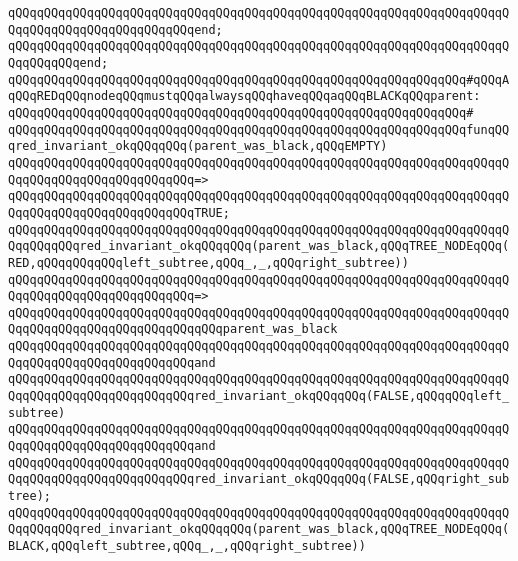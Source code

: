 \verb|qQQqqQQqqQQqqQQqqQQqqQQqqQQqqQQqqQQqqQQqqQQqqQQqqQQqqQQqqQQqqQQqqQQqqQQqqQQqqQQqqQQqqQQqqQQqqQQqend;|\newline
\verb|qQQqqQQqqQQqqQQqqQQqqQQqqQQqqQQqqQQqqQQqqQQqqQQqqQQqqQQqqQQqqQQqqQQqqQQqqQQqqQQqend;|\newline
\newline
\verb|qQQqqQQqqQQqqQQqqQQqqQQqqQQqqQQqqQQqqQQqqQQqqQQqqQQqqQQqqQQqqQQq#qQQqAqQQqREDqQQqnodeqQQqmustqQQqalwaysqQQqhaveqQQqaqQQqBLACKqQQqparent:|\newline
\verb|qQQqqQQqqQQqqQQqqQQqqQQqqQQqqQQqqQQqqQQqqQQqqQQqqQQqqQQqqQQqqQQq#|\newline
\verb|qQQqqQQqqQQqqQQqqQQqqQQqqQQqqQQqqQQqqQQqqQQqqQQqqQQqqQQqqQQqqQQqfunqQQqred_invariant_okqQQqqQQq(parent_was_black,qQQqEMPTY)|\newline
\verb|qQQqqQQqqQQqqQQqqQQqqQQqqQQqqQQqqQQqqQQqqQQqqQQqqQQqqQQqqQQqqQQqqQQqqQQqqQQqqQQqqQQqqQQqqQQqqQQq=>|\newline
\verb|qQQqqQQqqQQqqQQqqQQqqQQqqQQqqQQqqQQqqQQqqQQqqQQqqQQqqQQqqQQqqQQqqQQqqQQqqQQqqQQqqQQqqQQqqQQqqQQqTRUE;|\newline
\newline
\verb|qQQqqQQqqQQqqQQqqQQqqQQqqQQqqQQqqQQqqQQqqQQqqQQqqQQqqQQqqQQqqQQqqQQqqQQqqQQqqQQqred_invariant_okqQQqqQQq(parent_was_black,qQQqTREE_NODEqQQq(RED,qQQqqQQqqQQqleft_subtree,qQQq_,_,qQQqright_subtree))|\newline
\verb|qQQqqQQqqQQqqQQqqQQqqQQqqQQqqQQqqQQqqQQqqQQqqQQqqQQqqQQqqQQqqQQqqQQqqQQqqQQqqQQqqQQqqQQqqQQqqQQq=>|\newline
\verb|qQQqqQQqqQQqqQQqqQQqqQQqqQQqqQQqqQQqqQQqqQQqqQQqqQQqqQQqqQQqqQQqqQQqqQQqqQQqqQQqqQQqqQQqqQQqqQQqqQQqparent_was_black|\newline
\verb|qQQqqQQqqQQqqQQqqQQqqQQqqQQqqQQqqQQqqQQqqQQqqQQqqQQqqQQqqQQqqQQqqQQqqQQqqQQqqQQqqQQqqQQqqQQqqQQqand|\newline
\verb|qQQqqQQqqQQqqQQqqQQqqQQqqQQqqQQqqQQqqQQqqQQqqQQqqQQqqQQqqQQqqQQqqQQqqQQqqQQqqQQqqQQqqQQqqQQqqQQqred_invariant_okqQQqqQQq(FALSE,qQQqqQQqleft_subtree)|\newline
\verb|qQQqqQQqqQQqqQQqqQQqqQQqqQQqqQQqqQQqqQQqqQQqqQQqqQQqqQQqqQQqqQQqqQQqqQQqqQQqqQQqqQQqqQQqqQQqqQQqand|\newline
\verb|qQQqqQQqqQQqqQQqqQQqqQQqqQQqqQQqqQQqqQQqqQQqqQQqqQQqqQQqqQQqqQQqqQQqqQQqqQQqqQQqqQQqqQQqqQQqqQQqred_invariant_okqQQqqQQq(FALSE,qQQqright_subtree);|\newline
\newline
\verb|qQQqqQQqqQQqqQQqqQQqqQQqqQQqqQQqqQQqqQQqqQQqqQQqqQQqqQQqqQQqqQQqqQQqqQQqqQQqqQQqred_invariant_okqQQqqQQq(parent_was_black,qQQqTREE_NODEqQQq(BLACK,qQQqleft_subtree,qQQq_,_,qQQqright_subtree))|\newline
